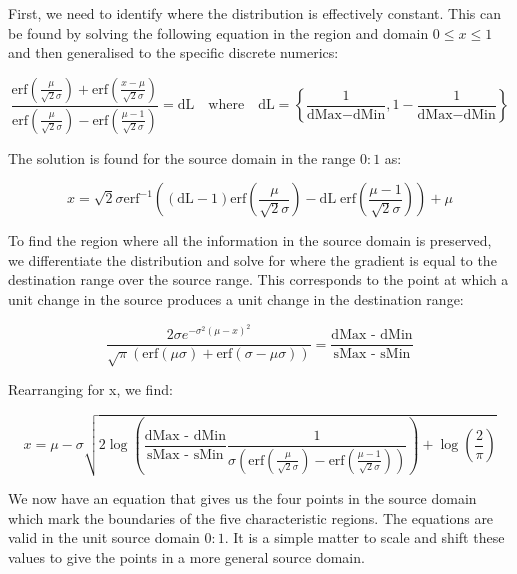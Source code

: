 First, we need to identify where the distribution is effectively constant. This can be found by solving the following equation in the region and domain $0 \le x \le 1$ and then generalised to the specific discrete numerics:

\begin{equation}\label{eq:0to1}
 \frac{\text{erf}\left(\frac{\mu }{\sqrt{2} \sigma }\right)+\text{erf}\left(\frac{x-\mu }{\sqrt{2} \sigma }\right)}{\text{erf}\left(\frac{\mu }{\sqrt{2} \sigma }\right)-\text{erf}\left(\frac{\mu -1}{\sqrt{2} \sigma }\right)}=\text{dL} \quad \text{where} \quad \text{dL} = \left\{ \frac{1}{\text{dMax} - \text{dMin}}, 1 - \frac{1}{\text{dMax} - \text{dMin}} \right\}
\end{equation}


The solution is found for the source domain in the range $0:1$ as:


\begin{equation}\label{eq:LowHigh}
 x = \sqrt{2} \sigma  \text{erf}^{-1}\left((\text{dL}-1) \text{erf}\left(\frac{\mu }{\sqrt{2} \sigma }\right)-\text{dL} \; \text{erf}\left(\frac{\mu -1}{\sqrt{2} \sigma }\right)\right)+\mu
\end{equation}

To find the region where all the information in the source domain is preserved, we differentiate the distribution and solve for where the gradient is equal to the destination range over the source range. This corresponds to the point at which a unit change in the source produces a unit change in the destination range:

\begin{equation}\label{eq:Boundaries}
\frac{2 \sigma e^{-\sigma^2 (\mu-x)^2}}{\sqrt{\pi } (\text{erf}(\mu \sigma)+\text{erf}(\sigma-\mu \sigma))}=\frac{\text{dMax - dMin}}{\text{sMax - sMin}}
\end{equation}

Rearranging for x, we find:

\begin{equation}\label{eq:PreservedRegion}
 x=\mu -\sigma  \sqrt{2 \log \left( \frac{\text{dMax - dMin}}{\text{sMax - sMin}} \frac{1}{ \sigma  \left(\text{erf}\left(\frac{\mu }{\sqrt{2} \sigma }\right)-\text{erf}\left(\frac{\mu -1}{\sqrt{2} \sigma }\right)\right)}\right)+\log \left(\frac{2}{\pi }\right)}
\end{equation}

We now have an equation that gives us the four points in the source domain which mark the boundaries of the five characteristic regions. The equations are valid in the unit source domain $0:1$. It is a simple matter to scale and shift these values to give the points in a more general source domain.


